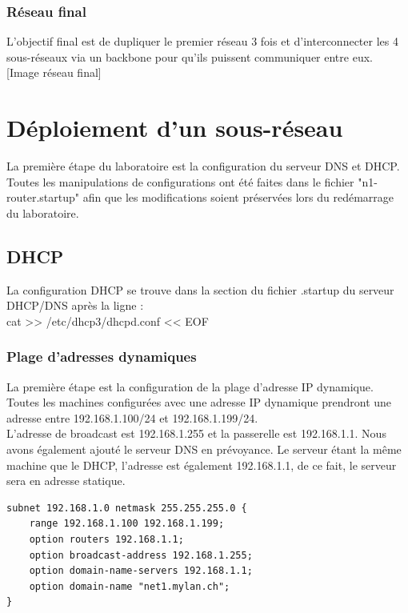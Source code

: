 \documentclass{article}
\begin{document}
\subsubsection{Réseau final}

L'objectif final est de dupliquer le premier réseau 3 fois et d'interconnecter les 4 sous-réseaux via un backbone pour qu'ils puissent communiquer entre eux.\\

[Image réseau final]

\clearpage

\section{Déploiement d'un sous-réseau}

La première étape du laboratoire est la configuration du serveur DNS et DHCP. Toutes les manipulations de configurations ont été faites dans le fichier "n1-router.startup" afin que les modifications soient préservées lors du redémarrage du laboratoire.

\subsection{DHCP}

La configuration DHCP se trouve dans la section du fichier .startup du serveur DHCP/DNS après la ligne : \\

cat >> /etc/dhcp3/dhcpd.conf << EOF

\subsubsection{Plage d'adresses dynamiques}

La première étape est la configuration de la plage d'adresse IP dynamique. Toutes les machines configurées avec une adresse IP dynamique prendront une adresse entre 192.168.1.100/24 et 192.168.1.199/24.\\

L'adresse de broadcast est 192.168.1.255 et la passerelle est 192.168.1.1. Nous avons également ajouté le serveur DNS en prévoyance. Le serveur étant la même machine que le DHCP, l'adresse est également 192.168.1.1, de ce fait, le serveur sera en adresse statique.\\

\begin{lstlisting}
subnet 192.168.1.0 netmask 255.255.255.0 {
	range 192.168.1.100 192.168.1.199;
	option routers 192.168.1.1;
	option broadcast-address 192.168.1.255;
	option domain-name-servers 192.168.1.1;
	option domain-name "net1.mylan.ch";
}
\end{lstlisting}
\end{document}
